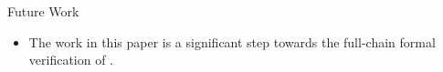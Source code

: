 \begin{frame}{Future Work}
  \begin{itemize}
      \setlength{\itemsep}{2mm}
    \item The work in this paper is a significant step towards the
      full-chain formal verification of \spx.
  \end{itemize}
\end{frame}
